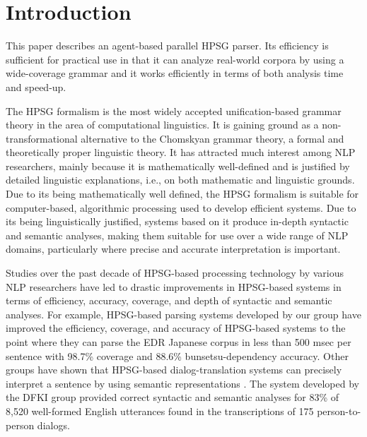 \def\qed{}


\maketitle

\section{Introduction}
  This paper describes an agent-based parallel HPSG parser.  Its
efficiency is sufficient for practical use in that it can analyze
real-world corpora by using a wide-coverage grammar and it works
efficiently in terms of both analysis time and speed-up.

  The HPSG formalism \cite{HPSG2} is the most widely accepted
unification-based grammar theory in the area of computational
linguistics.  It is gaining ground as a non-transformational
alternative to the Chomskyan grammar theory, a formal and
theoretically proper linguistic theory.  It has attracted much
interest among NLP researchers, mainly because it is mathematically
well-defined \cite{BOBCARPENTER} and is justified by detailed
linguistic explanations, i.e., on both mathematic and linguistic
grounds.  Due to its being mathematically well defined, the HPSG
formalism is suitable for computer-based, algorithmic processing used
to develop efficient systems.  Due to its being linguistically
justified, systems based on it produce in-depth syntactic and semantic
analyses, making them suitable for use over a wide range of NLP
domains, particularly where precise and accurate interpretation is
important.

  Studies over the past decade of HPSG-based processing technology by
various NLP researchers \cite{Torisawa2000,Kiefer99,Copestake95} have
led to drastic improvements in HPSG-based systems in terms of
efficiency, accuracy, coverage, and depth of syntactic and semantic
analyses.  For example, HPSG-based parsing systems developed by our
group \cite{Tateisi98,Mitsuishi98,Makino98,Torisawa2000,Yusuke2000}
have improved the efficiency, coverage, and accuracy of HPSG-based
systems to the point where they can parse the EDR Japanese corpus in
less than 500 msec per sentence with 98.7\% coverage and 88.6\%
bunsetsu-dependency accuracy.  Other groups have shown that HPSG-based
dialog-translation systems can precisely interpret a sentence by using
semantic representations
\cite{Uszkoreit94,Krieger94,Kasper99,Noord99}.  The system developed
by the DFKI group \cite{Uszkoreit94,Flickinger2000} provided correct
syntactic and semantic analyses for 83\% of 8,520 well-formed English
utterances found in the transcriptions of 175 person-to-person
dialogs.

